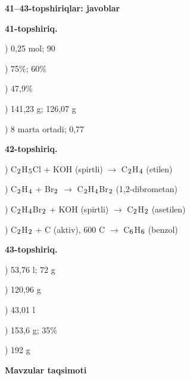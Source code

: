\documentclass[11pt,a4paper]{article}
\renewcommand{\textsubscript}[1]{\ensuremath{_{\text{\fontsize{8}{8}\selectfont #1}}}}
\begin{document}
\noindent\textbf{41--43-topshiriqlar: javoblar}\par\smallskip
\noindent\textbf{41-topshiriq.}\par
{}) 0,25 mol; 90\par
{}) 75\%; 60\%\par
{}) 47,9\%\par
{}) 141,23 g; 126,07 g\par
{}) 8 marta ortadi; 0,77\par
\noindent\textbf{42-topshiriq.}\par
{}) C\textsubscript{2}H\textsubscript{5}Cl + KOH (spirtli) $\to$ C\textsubscript{2}H\textsubscript{4} (etilen)\par
{}) C\textsubscript{2}H\textsubscript{4} + Br\textsubscript{2} $\to$ C\textsubscript{2}H\textsubscript{4}Br\textsubscript{2} (1,2-dibrometan)\par
{}) C\textsubscript{2}H\textsubscript{4}Br\textsubscript{2} + KOH (spirtli) $\to$ C\textsubscript{2}H\textsubscript{2} (asetilen)\par
{}) C\textsubscript{2}H\textsubscript{2} + C (aktiv), 600 \textdegree{}C $\to$ C\textsubscript{6}H\textsubscript{6} (benzol)\par
\noindent\textbf{43-topshiriq.}\par
{}) 53,76 l; 72 g\par
{}) 120,96 g\par
{}) 43,01 l\par
{}) 153,6 g; 35\%\par
{}) 192 g\par
\par\bigskip\noindent\textbf{Mavzular taqsimoti}\par\smallskip
\end{document}
